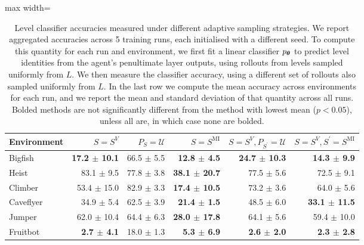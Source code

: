 \begin{table}[!htb]
\caption{Level classifier accuracies measured under different adaptive sampling strategies. We report aggregated accuracies across 5 training runs, each initialised with a different seed. To compute this quantity for each run and environment, we first fit a linear classifier $p_{\bm{\theta}}$ to predict level identities from the agent's penultimate layer outputs, using rollouts from levels sampled uniformly from $L$. We then measure the classifier accuracy, using a different set of rollouts also sampled uniformly from $L$. In the last row we compute the mean accuracy across environments for each run, and we report the mean and standard deviation of that quantity across all runs. Bolded methods are not significantly different from the method with lowest mean ($p<0.05$), unless all are, in which case none are bolded.}
\label{c3:tb:procgen_accuracy}
\vskip 0.15in
\begin{center}
\begin{small}
\begin{sc}
\begin{adjustbox}{max width=\linewidth}
\begin{tabular}{lrrrrr}
\toprule
                Environment &                  $S=S^V$ &       $P_S=\mathcal{U}$ &      $S=S^{\mathrm{MI}}$ & $S=S^V, P_{S^\prime}=\mathcal{U}$ & $S=S^V, S^\prime=S^{\mathrm{MI}}$ \\
\midrule
                    Bigfish & \textbf{17.2 $\pm$ 10.1} &          66.5 $\pm$ 5.5 &  \textbf{12.8 $\pm$ 4.5} &          \textbf{24.7 $\pm$ 10.3} &           \textbf{14.3 $\pm$ 9.9} \\
                      Heist &           83.1 $\pm$ 9.5 &          77.8 $\pm$ 3.8 & \textbf{38.1 $\pm$ 20.7} &                    77.5 $\pm$ 5.6 &                    72.5 $\pm$ 9.1 \\
                    Climber &          53.4 $\pm$ 15.0 &          82.9 $\pm$ 3.3 & \textbf{17.4 $\pm$ 10.5} &                    73.2 $\pm$ 3.6 &                    64.0 $\pm$ 5.6 \\
                  Caveflyer &           34.9 $\pm$ 5.4 &          62.5 $\pm$ 3.9 &  \textbf{21.4 $\pm$ 1.5} &                    48.5 $\pm$ 6.0 &          \textbf{33.1 $\pm$ 11.5} \\
                     Jumper &          62.0 $\pm$ 10.4 &          64.4 $\pm$ 6.3 & \textbf{28.0 $\pm$ 17.8} &                    64.1 $\pm$ 5.6 &                   59.4 $\pm$ 10.0 \\
                   Fruitbot &   \textbf{2.7 $\pm$ 4.1} &          18.0 $\pm$ 1.3 &   \textbf{5.3 $\pm$ 6.9} &            \textbf{2.6 $\pm$ 2.0} &            \textbf{2.3 $\pm$ 2.8} \\

\end{tabular}
\end{adjustbox}
\end{sc}
\end{small}
\end{center}
\end{table}

